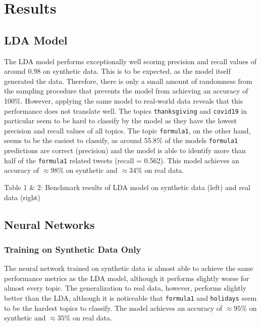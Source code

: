 \documentclass[11pt]{article}
\begin{document}
\section{Results}
\subsection{LDA Model}

The LDA model performs exceptionally well scoring precision and recall values of around 0.98 on synthetic data. This is to be expected, as the model itself generated the data. Therefore, there is only a small amount of randomness from the sampling procedure that prevents the model from achieving an accuracy of 100\%. However, applying the same model to real-world data reveals that this performance does not translate well. The topics \texttt{thanksgiving} and \texttt{covid19} in particular seem to be hard to classify by the model as they have the lowest precision and recall values of all topics. The topic \texttt{formula1}, on the other hand, seems to be the easiest to classify, as around 55.8\% of the models \texttt{formula1} predictions are correct (precision) and the model is able to identify more than half of the \texttt{formula1} related tweets (recall = 0.562). This model achieves an accuracy of $\approx 98\%$ on synthetic and $\approx 34\%$ on real data.
\begin{center}

\qquad

\end{center}
\begin{center}
Table 1 \& 2: Benchmark results of LDA model on synthetic data (left) and real data (right)
\end{center}

\subsection{Neural Networks}
\subsubsection{Training on Synthetic Data Only}
The neural network trained on synthetic data is almost able to achieve the same performance metrics as the LDA model, although it performs slightly worse for almost every topic. The generalization to real data, however, performs slightly better than the LDA, although it is noticeable that \texttt{formula1} and \texttt{holidays} seem to be the hardest topics to classify.
The model achieves an accuracy of $\approx 95\%$ on synthetic and $\approx 35\%$ on real data.
\end{document}
